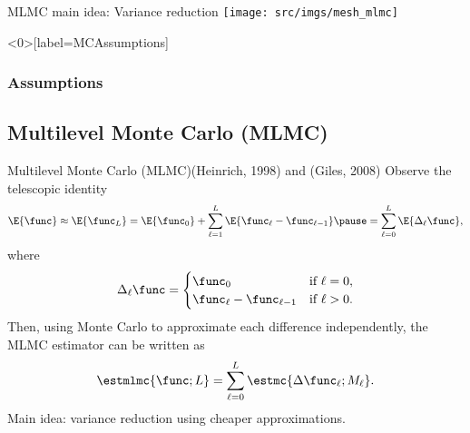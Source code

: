 \begin{frame}{MLMC main idea: Variance reduction}
\centering
\texttt{[image: src/imgs/mesh\_mlmc]}
\end{frame}


\begin{frame}<0>[label=MCAssumptions]\frametitle{Assumptions}


{
\vskip 0.5cm
\vskip 0.5cm
}
\end{frame}

\subsection{Multilevel Monte Carlo (MLMC)}
\begin{frame}{Multilevel Monte Carlo (MLMC){\quad \tiny (Heinrich, 1998) and (Giles, 2008)}}
  Observe the telescopic identity
  \[
    \E{\func} \approx \E{\func_{L}} = \E{\func_{0}} +
    \sum_{{\ell}=1}^{L} \E{\func_{\ell} -
      \func_{{\ell - 1}}} \pause
= \sum_{{\ell}=0}^{{L}} \E{ \Delta_\ell \func}, \]
where
  \begin{align*}
    \Delta_\ell \func = \begin{cases}
      \func_{0} & \text{if } \ell=0, \\
      \func_{{\ell}} -   \func_{{\ell-1}} & \text{if } \ell> 0.
      \end{cases}
    \end{align*}
    \pause Then, using Monte Carlo to approximate each difference independently, the
    MLMC estimator can be written as
    \begin{align*}
      \estmlmc{\func ; L} = \sum_{{\ell}=0}^{{L}} \estmc{\Delta
      \func_\ell ; M_\ell}.
    \end{align*}
    Main idea: variance reduction using cheaper approximations.
\end{frame}

